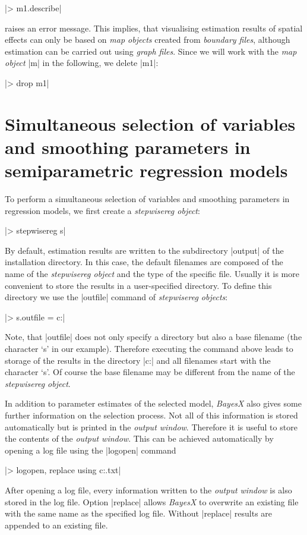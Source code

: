 |> m1.describe|

raises an error message. This implies, that visualising estimation results of spatial effects can only be based on {\it map
objects} created from {\it boundary files}, although estimation can be carried out using {\it graph files}. Since we will work
with the {\it map object} |m| in the following, we delete |m1|:

|> drop m1|

\section[Simultaneously selecting variables and smoothing parameters]{Simultaneous selection of variables and smoothing parameters in semiparametric
regression models}\label{step:regression}

To perform a simultaneous selection of variables and smoothing parameters in regression models, we first create a {\it
stepwisereg object}:

|> stepwisereg s|

By default, estimation results are written to the subdirectory |output| of the installation directory. In this case, the
default filenames are composed of the name of the {\it stepwisereg object} and the type of the specific file. Usually it is
more convenient to store the results in a user-specified directory. To define this directory we use the |outfile| command of
{\it stepwisereg objects}:

|> s.outfile = c:\data\s|

Note, that |outfile| does not only specify a directory but also a base filename (the character `s' in our example). Therefore
executing the command above leads to storage of the results in the directory |c:\data| and all filenames start with the
character `s'. Of course the base filename may be different from the name of the {\it stepwisereg object}.

In addition to parameter estimates of the selected model, {\it BayesX} also gives some further information on the selection
process. Not all of this information is stored automatically but is printed in the {\it output window}. Therefore it is useful
to store the contents of the {\it output window}. This can be achieved automatically by opening a log file using the |logopen|
command

|> logopen, replace using c:\data\logstep.txt|

After opening a log file, every information written to the {\it output window} is also stored in the log file. Option |replace|
allows {\it BayesX} to overwrite an existing file with the same name as the specified log file. Without |replace| results are
appended to an existing file.

